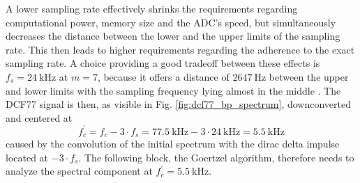 \documentclass[conference]{IEEEtran}
\begin{document}
\par
A lower sampling rate effectively shrinks the requirements regarding computational power, memory size and the ADC's speed, but simultaneously decreases the
distance between the lower and the upper limits of the sampling rate.
This then leads to higher requirements regarding the adherence to the exact sampling rate.
A choice providing a good tradeoff between these effects is $f_{s} = \SI{24}{\kilo\hertz}$ at $m = 7$, because it offers a distance of $\SI{2647}{\hertz}$ between the upper and lower limits with the sampling frequency lying almost in the middle \cite{b10}.
The DCF77 signal is then, as visible in Fig. \ref{fig:dcf77_bp_spectrum}, downconverted and centered at
\begin{equation}
    f_{c}^{'} = f_{c} - 3 \cdot f_{s} = \SI{77.5}{\kilo\hertz} - 3 \cdot \SI{24}{\kilo\hertz} = \SI{5.5}{\kilo\hertz}
\end{equation}
caused by the convolution of the initial spectrum with the dirac delta impulse located at $-3 \cdot f_{s}$. 
The following block, the Goertzel algorithm, therefore needs to analyze the spectral component at $f_{c}^{'} = \SI{5.5}{\kilo\hertz}$.
\end{document}
